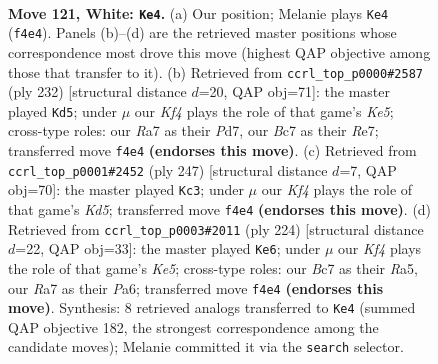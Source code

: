 \documentclass[11pt]{article}
\begin{document}
\clearpage

\begin{figure}[p]\centering
\begin{subfigure}{0.46\textwidth}\centering
\resizebox{\linewidth}{!}{%
\newchessgame
\chessboard[
  setfen={5r2/R1B4k/8/P7/5K2/8/8/8 w - - 11 121},
  showmover=false,
  pgfstyle=straightmove, color=movearrow, markmove={f4-e4}
]}
\caption{}
\end{subfigure}\hfill
\begin{subfigure}{0.46\textwidth}\centering
\resizebox{\linewidth}{!}{%
\newchessgame
\chessboard[
  setfen={8/3PR3/6kp/4K3/8/8/8/4r3 w - - 1 117},
  showmover=false,
  pgfstyle=straightmove, color=movearrow, markmove={e5-d5}
]}
\caption{}
\end{subfigure}
\\[4pt]
\begin{subfigure}{0.46\textwidth}\centering
\resizebox{\linewidth}{!}{%
\newchessgame
\chessboard[
  setfen={8/p1r5/8/2b5/B2k3R/8/4K3/8 b - - 43 124},
  showmover=false,
  pgfstyle=straightmove, color=movearrow, markmove={d4-c3}
]}
\caption{}
\end{subfigure}\hfill
\begin{subfigure}{0.46\textwidth}\centering
\resizebox{\linewidth}{!}{%
\newchessgame
\chessboard[
  setfen={8/k7/P7/R1P1K1r1/8/8/8/8 w - - 49 113},
  showmover=false,
  pgfstyle=straightmove, color=movearrow, markmove={e5-e6}
]}
\caption{}
\end{subfigure}
\caption{\textbf{Move 121, White: \texttt{Ke4}.} (a) Our position; Melanie plays \texttt{Ke4} (\texttt{f4e4}). Panels (b)--(d) are the retrieved master positions whose correspondence most drove this move (highest QAP objective among those that transfer to it). (b) Retrieved from \texttt{ccrl\_top\_p0000\#2587} (ply 232) [structural distance $d$=20, QAP obj=71]: the master played \texttt{Kd5}; under $\mu$ our \emph{Kf4} plays the role of that game's \emph{Ke5}; cross-type roles: our \emph{R}a7 as their \emph{P}d7, our \emph{B}c7 as their \emph{R}e7; transferred move \texttt{f4e4} \textbf{(endorses this move)}. (c) Retrieved from \texttt{ccrl\_top\_p0001\#2452} (ply 247) [structural distance $d$=7, QAP obj=70]: the master played \texttt{Kc3}; under $\mu$ our \emph{Kf4} plays the role of that game's \emph{Kd5}; transferred move \texttt{f4e4} \textbf{(endorses this move)}. (d) Retrieved from \texttt{ccrl\_top\_p0003\#2011} (ply 224) [structural distance $d$=22, QAP obj=33]: the master played \texttt{Ke6}; under $\mu$ our \emph{Kf4} plays the role of that game's \emph{Ke5}; cross-type roles: our \emph{B}c7 as their \emph{R}a5, our \emph{R}a7 as their \emph{P}a6; transferred move \texttt{f4e4} \textbf{(endorses this move)}. Synthesis: 8 retrieved analogs transferred to \texttt{Ke4} (summed QAP objective 182, the strongest correspondence among the candidate moves); Melanie committed it via the \texttt{search} selector.}
\label{fig:thought-m240}
\end{figure}
\end{document}
